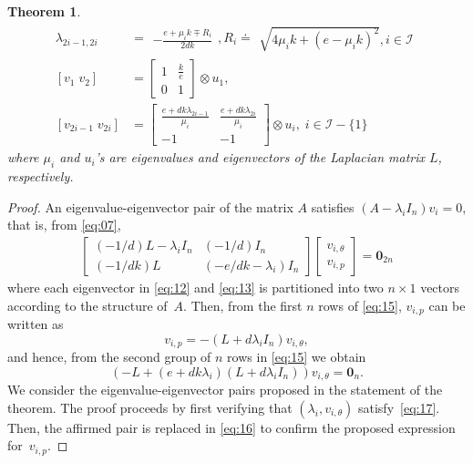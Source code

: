 \documentclass[letter, 10pt, conference]{ieeeconf}
\newtheorem{theorem}{Theorem}[section]
\newcommand{\I}{\mathcal{I}}
\newcommand{\1}{\mathbf{1}}
\newcommand{\0}{\mathbf{0}}
\begin{document}
{\begin{theorem}
\begin{align}
	\label{eq:11}
	\lambda_{2i-1,2i}&=
	  \begin{smallmatrix} 
	    -\frac{e+\mu_i k \mp R_i}{2dk}
	  \end{smallmatrix},
	R_i \doteq 
	  \begin{smallmatrix} 
	    \sqrt{4\mu_i k + (e-\mu_i k)^2},  i \in \I
	  \end{smallmatrix}
	\\
	\label{eq:12}
	[v_1\; v_2]&=\left[\begin{smallmatrix}
	   1 & \frac{k}{e} \\ 0 & 1 \end{smallmatrix}\right] \otimes u_1, \\
	\label{eq:13}
	[v_{2i-1}\;v_{2i}]
	&= \left[\begin{smallmatrix}
		\frac{e+dk\lambda_{2i-1}}{\mu_i} & \frac{e+dk\lambda_{2i}}{\mu_i} \\
		-1 & -1
	\end{smallmatrix}\right] \otimes u_i, 
\; i \in \I-\{1\}
  \end{align}
  where $\mu_i$ and $u_i$'s are eigenvalues and eigenvectors of the Laplacian
  matrix $L$, respectively.
\end{theorem}

\begin{proof}
  An eigenvalue-eigenvector pair of the matrix $A$ satisfies 
  $(A-\lambda_i I_n)v_i=0$, that is, from \eqref{eq:07},
  \begin{align}
  	\label{eq:15}
  	\begin{bmatrix}
  		(-1/d)L-\lambda_i I_n  & (-1/d)I_n \\
  		(-1/dk)L & (-e/dk - \lambda_i)I_n
  	\end{bmatrix}
  	\begin{bmatrix} v_{i,\theta} \\ v_{i,p} \end{bmatrix}
  	= \0_{2n}
  	\end{align}
where each eigenvector in \eqref{eq:12} and \eqref{eq:13} is
        partitioned into two $n \times 1$ vectors according to the
        structure of~$A$. Then, from the first $n$ rows of
        \eqref{eq:15}, $v_{i,p}$ can be written as
  \begin{equation}
  	\label{eq:16}
  	v_{i,p}=-(L+d\lambda_i I_n) v_{i,\theta},
  \end{equation}
  and hence, from the second group of $n$ rows in \eqref{eq:15} we
  obtain
  \begin{equation}
  	\label{eq:17}
  	\left(-L+(e+dk\lambda_i)(L+d\lambda_i I_n)\right) v_{i,\theta} = \0_n.
  \end{equation}
  We consider the eigenvalue-eigenvector pairs proposed in the
  statement of the theorem. The proof proceeds by first verifying that
  $(\lambda_i,v_{i,\theta})$ satisfy~\eqref{eq:17}.
Then, the affirmed pair is replaced in \eqref{eq:16} to confirm the
  proposed expression for~$v_{i,p}$. 


\end{proof}}
\end{document}
